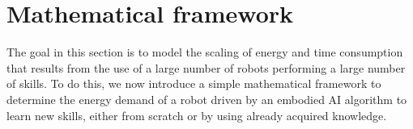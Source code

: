 


\section{Mathematical framework}\label{sec:transfer_learning}
The goal in this section is to model the scaling of energy and time consumption that results from the use of a large number of robots performing a large number of skills. To do this, we now introduce a simple mathematical framework to determine the energy demand of a robot driven by an embodied AI algorithm to learn new skills, either from scratch or by using already acquired knowledge.



